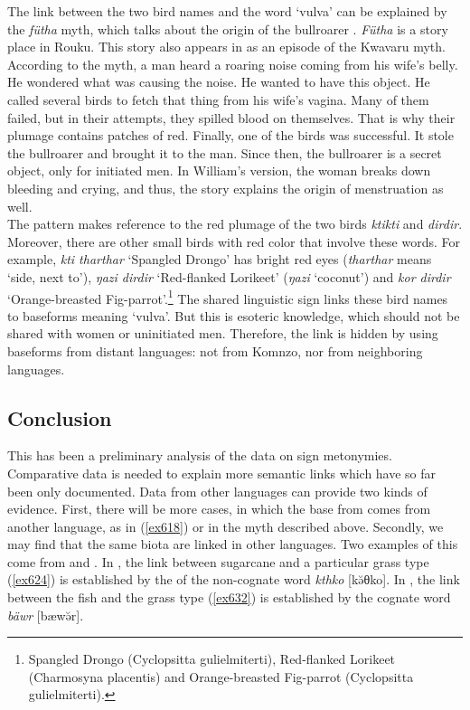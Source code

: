 The link between the two bird names and the word `vulva' can be explained by the \emph{fütha} myth, which talks about the origin of the bullroarer \citep[80]{Ayres:ws}. \emph{Fütha} is a story place in Rouku. This story also appears in \citep[307]{Williams:1936transfly} as an episode of the Kwavaru myth. According to the myth, a man heard a roaring noise coming from his wife's belly. He wondered what was causing the noise. He wanted to have this object. He called several birds  to fetch that thing from his wife's vagina. Many of them failed, but in their attempts, they spilled blood on themselves. That is why their plumage contains patches of red. Finally, one of the birds was successful. It stole the bullroarer and brought it to the man. Since then, the bullroarer is a secret object, only for initiated men. In William's version, the woman breaks down bleeding and crying, and thus, the story explains the origin of menstruation as well.\\

The  pattern makes reference to the red plumage of the two birds \emph{ktikti} and \emph{dirdir}. Moreover, there are other small birds with red color that involve these words. For example, \emph{kti tharthar} `Spangled Drongo' has bright red eyes (\emph{tharthar} means `side, next to'), \emph{ŋazi dirdir} `Red-flanked Lorikeet' (\emph{ŋazi} `coconut') and \emph{kor dirdir} `Orange-breasted Fig-parrot'.\footnote{Spangled Drongo (Cyclopsitta gulielmiterti), Red-flanked Lorikeet (Charmosyna placentis) and Orange-breasted Fig-parrot (Cyclopsitta gulielmiterti).} The shared linguistic sign links these bird names to baseforms meaning `vulva'. But this is esoteric knowledge, which should not be shared with women or uninitiated men. Therefore, the link is hidden by using baseforms from distant languages: not from Komnzo, nor from neighboring languages.

\subsection{Conclusion}\label{redupconcl}

This has been a preliminary analysis of the data on sign metonymies. Comparative data is needed to explain more semantic links which have so far been only documented. Data from other languages can provide two kinds of evidence. First, there will be more cases, in which the base from comes from another language, as in (\ref{ex618}) or in the myth described above. Secondly, we may find that the same biota are linked in other languages. Two examples of this come from  and . In , the link between sugarcane and a particular grass type (\ref{ex624}) is established by the  of the non-cognate word \emph{kthko} [kə̆θko]. In , the  link between the fish and the grass type (\ref{ex632}) is established by the cognate word \emph{bäwr} [bæwə̆r].

